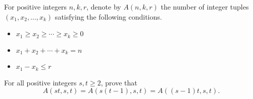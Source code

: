 For positive integers $n, k, r$, denote by $A(n, k, r)$ the number of integer tuples $(x_1, x_2, \ldots, x_k)$ satisfying the following conditions.
\begin{itemize}
	\item $x_1 \ge x_2 \ge \cdots \ge x_k \ge 0$
	\item $x_1+x_2+ \cdots +x_k = n$
	\item $x_1-x_k \le r$
\end{itemize}
For all positive integers $s, t \ge 2$, prove that $$A(st, s, t) = A(s(t-1), s, t) = A((s-1)t, s, t).$$